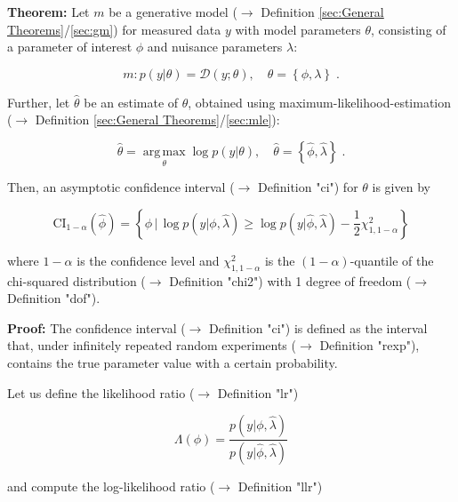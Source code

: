 \documentclass[a4paper,12pt,twoside]{book}
\begin{document}
\textbf{Theorem:} Let $m$ be a generative model ($\rightarrow$ Definition \ref{sec:General Theorems}/\ref{sec:gm}) for measured data $y$ with model parameters $\theta$, consisting of a parameter of interest $\phi$ and nuisance parameters $\lambda$:

\begin{equation} \label{eq:ci-wilks-mod-par}
m: p(y|\theta) = \mathcal{D}(y; \theta), \quad \theta = \left\lbrace \phi, \lambda \right\rbrace \; .
\end{equation}

Further, let $\hat{\theta}$ be an estimate of $\theta$, obtained using maximum-likelihood-estimation ($\rightarrow$ Definition \ref{sec:General Theorems}/\ref{sec:mle}):

\begin{equation} \label{eq:ci-wilks-theta-mle}
\hat{\theta} = \operatorname*{arg\,max}_{\theta} \log p(y|\theta), \quad \hat{\theta} = \left\lbrace \hat{\phi}, \hat{\lambda} \right\rbrace \; .
\end{equation}

Then, an asymptotic confidence interval ($\rightarrow$ Definition "ci") for $\theta$ is given by

\begin{equation} \label{eq:ci-wilks-ci-wilks}
\mathrm{CI}_{1-\alpha}(\hat{\phi}) = \left\lbrace \phi \, \vert \, \log p(y|\phi,\hat{\lambda}) \geq \log p(y|\hat{\phi},\hat{\lambda}) - \frac{1}{2} \chi^2_{1,1-\alpha} \right\rbrace
\end{equation}

where $1-\alpha$ is the confidence level and $\chi^2_{1,1-\alpha}$ is the $(1-\alpha)$-quantile of the chi-squared distribution ($\rightarrow$ Definition "chi2") with 1 degree of freedom ($\rightarrow$ Definition "dof").


\vspace{1em}
\textbf{Proof:} The confidence interval ($\rightarrow$ Definition "ci") is defined as the interval that, under infinitely repeated random experiments ($\rightarrow$ Definition "rexp"), contains the true parameter value with a certain probability.

Let us define the likelihood ratio ($\rightarrow$ Definition "lr")

\begin{equation} \label{eq:ci-wilks-lr}
\Lambda(\phi) = \frac{p(y|\phi,\hat{\lambda})}{p(y|\hat{\phi},\hat{\lambda})}
\end{equation}

and compute the log-likelihood ratio ($\rightarrow$ Definition "llr")
\end{document}
